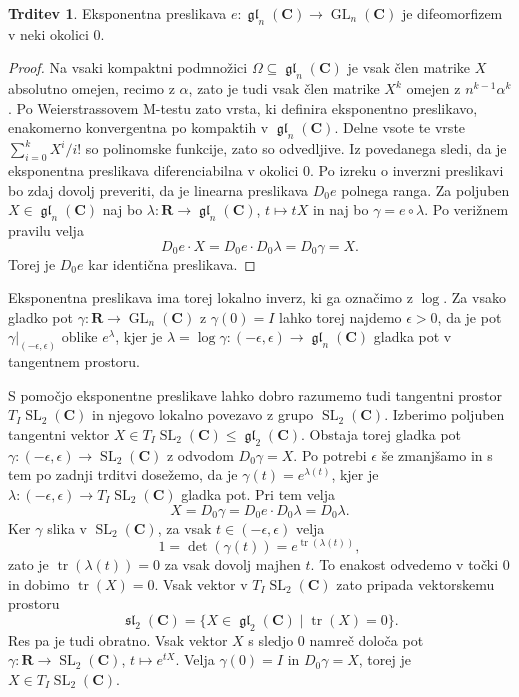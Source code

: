 \documentclass[11pt]{book}
\def\RR{\mathbf{R}}
\def\CC{\mathbf{C}}
\DeclareMathOperator\tr{tr}
\DeclareMathOperator\GL{GL}
\DeclareMathOperator\glfrak{\mathfrak{gl}}
\DeclareMathOperator\slfrak{\mathfrak{sl}}
\DeclareMathOperator\SL{SL}
\theoremstyle{definition}
\theoremstyle{zgled}
\theoremstyle{zgledbrezstevilke}
\theoremstyle{odprtproblem}
\theoremstyle{domacanaloga}
\newenvironment{dokaz}
    {\color{siva}\begin{proof}}
    {\end{proof}}
\theoremstyle{izrek}
\newtheorem{trditev}[theorem]{Trditev}
\begin{document}
\begin{trditev}
Eksponentna preslikava $e \colon \glfrak_n(\CC) \to \GL_n(\CC)$ je difeomorfizem v neki okolici $0$.
\end{trditev}
\begin{dokaz}
Na vsaki kompaktni podmnožici $\Omega \subseteq \glfrak_n(\CC)$ je vsak člen matrike $X$ absolutno omejen, recimo z $\alpha$, zato je tudi vsak člen matrike $X^k$ omejen z $n^{k-1} \alpha^k$. Po Weierstrassovem M-testu zato vrsta, ki definira eksponentno preslikavo, enakomerno konvergentna po kompaktih v $\glfrak_n(\CC)$. Delne vsote te vrste $\sum_{i = 0}^{k} X^i / i!$ so polinomske funkcije, zato so odvedljive. Iz povedanega sledi, da je eksponentna preslikava diferenciabilna v okolici $0$. Po izreku o inverzni preslikavi bo zdaj dovolj preveriti, da je linearna preslikava $D_0 e$ polnega ranga. Za poljuben $X \in \glfrak_n(\CC)$ naj bo $\lambda \colon \RR \to \glfrak_n(\CC)$, $t \mapsto tX$ in naj bo $\gamma = e \circ \lambda$. Po verižnem pravilu velja
\[
    D_0 e \cdot X
    = D_0 e \cdot D_0 \lambda
    = D_0 \gamma
    = X.
\]
Torej je $D_0 e$ kar identična preslikava. 
\end{dokaz}

Eksponentna preslikava ima torej lokalno inverz, ki ga označimo z $\log$. Za vsako gladko pot $\gamma \colon \RR \to \GL_n(\CC)$ z $\gamma(0) = I$ lahko torej najdemo $\epsilon > 0$, da je pot $\gamma |_{(-\epsilon, \epsilon)}$ oblike $e^{\lambda}$, kjer je $\lambda = \log \gamma \colon (-\epsilon, \epsilon) \to \glfrak_n(\CC)$ gladka pot v tangentnem prostoru.

S pomočjo eksponentne preslikave lahko dobro razumemo tudi tangentni prostor $T_I \SL_2(\CC)$ in njegovo lokalno povezavo z grupo $\SL_2(\CC)$. Izberimo poljuben tangentni vektor $X \in T_I \SL_2(\CC) \leq \glfrak_2(\CC)$. Obstaja torej gladka pot $\gamma \colon (-\epsilon, \epsilon) \to \SL_2(\CC)$ z odvodom $D_0 \gamma = X$. Po potrebi $\epsilon$ še zmanjšamo in s tem po zadnji trditvi dosežemo, da je $\gamma(t) = e^{\lambda(t)}$, kjer je $\lambda \colon (-\epsilon, \epsilon) \to T_I \SL_2(\CC)$ gladka pot. Pri tem velja
\[
    X = D_0 \gamma
    = D_0 e \cdot D_0 \lambda
    = D_0 \lambda.
\]
Ker $\gamma$ slika v $\SL_2(\CC)$, za vsak $t \in (- \epsilon, \epsilon)$ velja 
\[
    1 = \det (\gamma(t)) = e^{\tr(\lambda(t))},
\]
zato je $\tr(\lambda(t)) = 0$ za vsak dovolj majhen $t$. To enakost odvedemo v točki $0$ in dobimo $\tr(X) = 0$. Vsak vektor v $T_I \SL_2(\CC)$ zato pripada vektorskemu prostoru
\[
    \textstyle \slfrak_2(\CC) = \{ X \in \glfrak_2(\CC) \mid \tr(X) = 0 \}.
\]
Res pa je tudi obratno. Vsak vektor $X$ s sledjo $0$ namreč določa pot $\gamma \colon \RR \to \SL_2(\CC)$, $t \mapsto e^{tX}$. Velja $\gamma(0) = I$ in $D_0 \gamma = X$, torej je $X \in T_I \SL_2(\CC)$.
\end{document}
